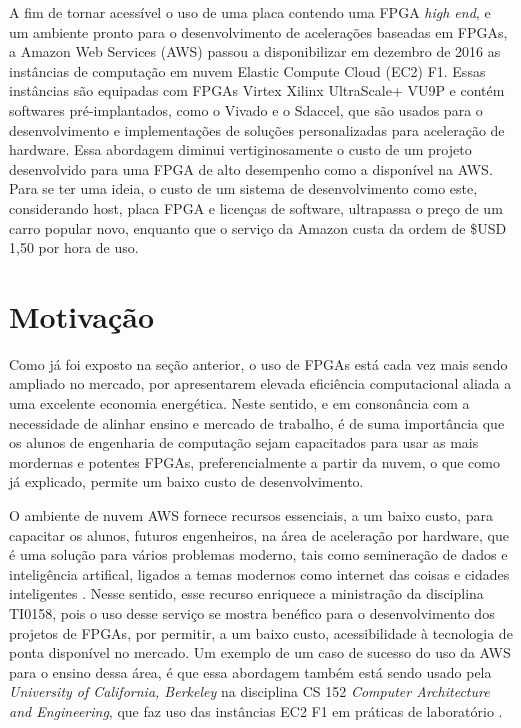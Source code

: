 A fim de tornar  acessível o uso de uma placa contendo uma FPGA \textit{high end}, e um ambiente pronto para o desenvolvimento de acelerações baseadas em FPGAs, a Amazon Web Services (AWS) passou a disponibilizar em dezembro de 2016 as instâncias de computação em nuvem Elastic Compute Cloud (EC2) F1. Essas instâncias são equipadas com FPGAs Virtex Xilinx UltraScale+ VU9P e contém softwares pré-implantados, como o Vivado e o Sdaccel, que são usados para o desenvolvimento e implementações de soluções personalizadas para aceleração de hardware. Essa abordagem diminui vertiginosamente o custo de um projeto desenvolvido para uma FPGA de alto desempenho como a disponível na AWS. Para se ter uma ideia, o custo de um sistema de desenvolvimento como este, considerando host, placa FPGA e licenças de software, ultrapassa o preço de um carro popular novo, enquanto que o serviço da Amazon custa da ordem de \$USD 1,50 por hora de uso. 


\section{Motivação}\label{sec:motivacao}

Como já foi exposto na seção anterior, o uso de FPGAs está cada vez mais sendo ampliado no mercado, por apresentarem elevada eficiência computacional aliada a uma excelente economia energética. Neste sentido, e em consonância com a necessidade de alinhar ensino e mercado de trabalho, é de suma importância que os alunos de engenharia de computação sejam capacitados para usar as mais mordernas e potentes FPGAs, preferencialmente a partir da nuvem, o que como já explicado, permite um baixo custo de desenvolvimento. 

O ambiente de nuvem AWS fornece recursos essenciais, a um baixo custo, para capacitar os alunos, futuros engenheiros, na área de aceleração por hardware, que é uma solução para vários problemas moderno, tais como semineração de dados e inteligência artifical, ligados a temas modernos como internet das coisas e cidades inteligentes . Nesse sentido, esse recurso enriquece a ministração da disciplina TI0158, pois o uso desse serviço se mostra benéfico para o desenvolvimento dos projetos de FPGAs, por permitir, a um baixo custo, acessibilidade à tecnologia de ponta disponível no mercado. Um exemplo de um caso de sucesso do uso da AWS para o ensino dessa área, é que essa abordagem também está sendo usado pela \textit{University of California, Berkeley} na disciplina CS 152 \textit{Computer Architecture and Engineering}, que faz uso das instâncias EC2 F1 em práticas de laboratório \cite{berkeley}.


